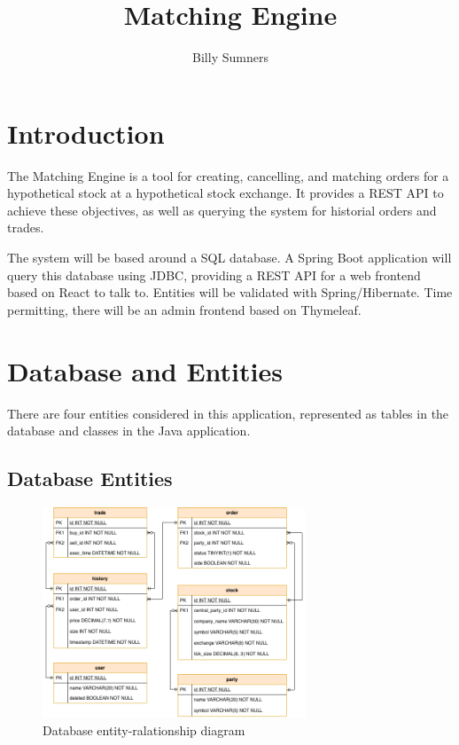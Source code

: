\documentclass{article}
\title{Matching Engine}
\author{Billy Sumners}
\begin{document}
\maketitle

\section{Introduction}

The Matching Engine is a tool for creating, cancelling, and matching orders for a hypothetical stock at a hypothetical stock exchange. It provides a REST API to achieve these objectives, as well as querying the system for historial orders and trades.

The system will be based around a SQL database. A Spring Boot application will query this database using JDBC, providing a REST API for a web frontend based on React to talk to. Entities will be validated with Spring/Hibernate. Time permitting, there will be an admin frontend based on Thymeleaf.

\section{Database and Entities}

There are four entities considered in this application, represented as tables in the database and classes in the Java application.

\subsection{Database Entities}

\begin{figure}[h]
    \centering
    \includegraphics[width=0.7\textwidth]{database-erd.png}
    \caption{Database entity-ralationship diagram}
\end{figure}
\end{document}

